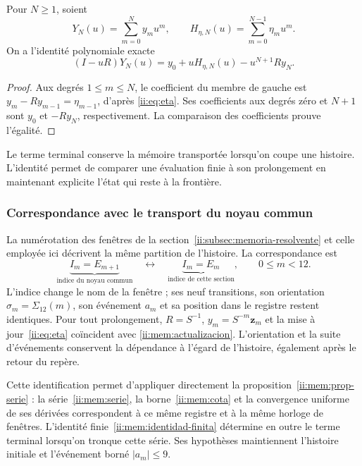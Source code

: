 \begin{proposition}
Pour $N\geq1$, soient
\[
Y_N(u)=\sum_{m=0}^N y_mu^m,\qquad
H_{\eta,N}(u)=\sum_{m=0}^{N-1}\eta_mu^m.
\]
On a l’identité polynomiale exacte
\begin{equation}
(I-uR)Y_N(u)=y_0+uH_{\eta,N}(u)-u^{N+1}Ry_N.
\label{ii:mem:identidad-finita}
\end{equation}
\end{proposition}
\begin{proof}
Aux degrés $1\leq m\leq N$, le coefficient du membre de gauche est
$y_m-Ry_{m-1}=\eta_{m-1}$, d’après \eqref{ii:eq:eta}.
Ses coefficients aux degrés zéro et $N+1$ sont $y_0$ et $-Ry_N$,
respectivement. La comparaison des coefficients prouve l’égalité.
\end{proof}

Le terme terminal conserve la mémoire transportée lorsqu’on coupe une histoire.
L’identité permet de comparer une évaluation finie à son prolongement
en maintenant explicite l’état qui reste à la frontière.

\subsubsection{Correspondance avec le transport du noyau commun}

La numérotation des fenêtres de la section~\ref{ii:subsec:memoria-resolvente}
et celle employée ici décrivent la même partition de l’histoire. La
correspondance est
\[
 \underbrace{I_m=E_{m+1}}_{\text{indice du noyau commun}}
 \quad\longleftrightarrow\quad
 \underbrace{I_m=E_m}_{\text{indice de cette section}},
 \qquad 0\leq m<12.
\]
L’indice change le nom de la fenêtre ; ses neuf transitions,
son orientation \(\sigma_m=\Sigma_{12}(m)\), son événement \(a_m\) et
sa position dans le registre restent identiques. Pour tout prolongement,
\(R=S^{-1}\), \(y_m=S^{-m}\mathbf z_m\) et la
mise à jour~\eqref{ii:eq:eta} coïncident avec
\eqref{ii:mem:actualizacion}. L’orientation et la suite d’événements
conservent la dépendance à l’égard de l’histoire, également après le
retour du repère.

Cette identification permet d’appliquer directement la
proposition~\ref{ii:mem:prop-serie} : la série~\eqref{ii:mem:serie}, la
borne~\eqref{ii:mem:cota} et la convergence uniforme de ses dérivées
correspondent à ce même registre et à la même horloge de fenêtres. L’identité
finie~\eqref{ii:mem:identidad-finita} détermine en outre le terme
terminal lorsqu’on tronque cette série. Ses hypothèses maintiennent l’histoire initiale
et l’événement borné \(|a_m|\leq9\).

